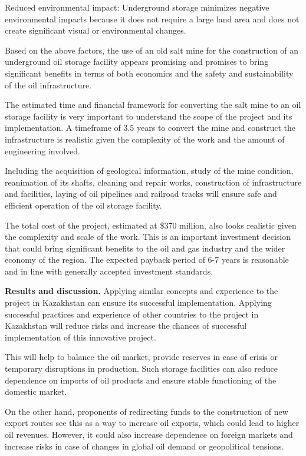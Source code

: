 \begin{multicols}{2}
Reduced environmental impact: Underground storage minimizes negative
environmental impacts because it does not require a large land area and
does not create significant visual or environmental changes.

Based on the above factors, the use of an old salt mine for the
construction of an underground oil storage facility appears promising
and promises to bring significant benefits in terms of both economics
and the safety and sustainability of the oil infrastructure.

The estimated time and financial framework for converting the salt mine
to an oil storage facility is very important to understand the scope of
the project and its implementation. A timeframe of 3.5 years to convert
the mine and construct the infrastructure is realistic given the
complexity of the work and the amount of engineering involved.

Including the acquisition of geological information, study of the mine
condition, reanimation of its shafts, cleaning and repair works,
construction of infrastructure and facilities, laying of oil pipelines
and railroad tracks will ensure safe and efficient operation of the oil
storage facility.

The total cost of the project, estimated at \$370 million, also looks
realistic given the complexity and scale of the work. This is an
important investment decision that could bring significant benefits to
the oil and gas industry and the wider economy of the region. The
expected payback period of 6-7 years is reasonable and in line with
generally accepted investment standards.

{\bfseries Results and discussion.} Applying similar concepts and
experience to the project in Kazakhstan can ensure its successful
implementation. Applying successful practices and experience of other
countries to the project in Kazakhstan will reduce risks and increase
the chances of successful implementation of this innovative project.

This will help to balance the oil market, provide reserves in case of
crisis or temporary disruptions in production. Such storage facilities
can also reduce dependence on imports of oil products and ensure stable
functioning of the domestic market.

On the other hand, proponents of redirecting funds to the construction
of new export routes see this as a way to increase oil exports, which
could lead to higher oil revenues. However, it could also increase
dependence on foreign markets and increase risks in case of changes in
global oil demand or geopolitical tensions.


\end{multicols}
